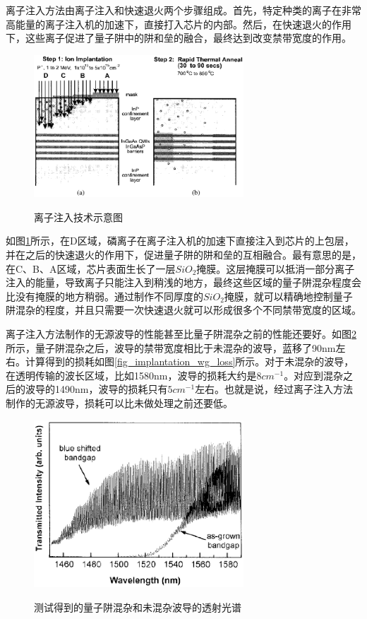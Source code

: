 \documentclass{ZJUthesis}
\begin{document}
离子注入方法由离子注入和快速退火两个步骤组成。首先，特定种类的离子在非常高能量的离子注入机的加速下，直接打入芯片的内部。然后，在快速退火的作用下，这些离子促进了量子阱中的阱和垒的融合，最终达到改变禁带宽度的作用。

\begin{figure}[htb]
  \centering
  \includegraphics[width=0.7\textwidth]{./Pictures/implantation.eps}\\
  \caption{离子注入技术示意图}
  \label{fig_implantation}
\end{figure}

如图\ref{fig_implantation}所示，在D区域，磷离子在离子注入机的加速下直接注入到芯片的上包层，并在之后的快速退火的作用下，促进量子阱的阱和垒的互相融合。最有意思的是，在C、B、A区域，芯片表面生长了一层$SiO_2$掩膜。这层掩膜可以抵消一部分离子注入的能量，导致离子只能注入到稍浅的地方，最终这些区域的量子阱混杂程度会比没有掩膜的地方稍弱。通过制作不同厚度的$SiO_2$掩膜，就可以精确地控制量子阱混杂的程度，并且只需要一次快速退火就可以形成很多个不同禁带宽度的区域。

离子注入方法制作的无源波导的性能甚至比量子阱混杂之前的性能还要好。如图\ref{fig_implantation_wg_test}所示，量子阱混杂之后，波导的禁带宽度相比于未混杂的波导，蓝移了90nm左右。计算得到的损耗如图\ref{fig_implantation_wg_loss}所示。对于未混杂的波导，在透明传输的波长区域，比如1580nm，波导的损耗大约是$8cm^{-1}$。对应到混杂之后的波导的1490nm，波导的损耗只有$5cm^{-1}$左右。也就是说，经过离子注入方法制作的无源波导，损耗可以比未做处理之前还要低。

\begin{figure}[htb]
  \centering
  \includegraphics[width=0.7\textwidth]{./Pictures/implantation_wg_test.eps}\\
  \caption{测试得到的量子阱混杂和未混杂波导的透射光谱}
  \label{fig_implantation_wg_test}
\end{figure}
\end{document}
